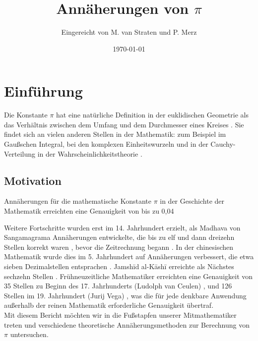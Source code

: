 \documentclass{scrartcl}
\title{Annäherungen von \(\pi\)}
\author{
  Eingereicht von M. van Straten und P. Merz
}
\date{\today}
\begin{document}
\maketitle
\cleardoublepage{}
\tableofcontents
\cleardoublepage{}

\section{Einführung}

Die Konstante \(\pi\) hat eine natürliche Definition in der euklidischen
Geometrie als das Verhältnis zwischen dem Umfang und dem Durchmesser eines
Kreises \cite{wikipedia:Pi, wikipedia:Euclidean_geometry,
    wikipedia:Circumference, wikipedia:Diameter}.
Sie findet sich an vielen anderen Stellen in der Mathematik: zum Beispiel im
Gaußschen Integral, bei den komplexen Einheitswurzeln und in der
Cauchy-Verteilung in der Wahrscheinlichkeitstheorie
\cite{wikipedia:Gaussian_integral, wikipedia:Roots_of_unity,
    wikipedia:Cauchy_distribution, wikipedia:Probability}.

\subsection{Motivation}

Annäherungen für die mathematische Konstante \(\pi\) in der Geschichte der
Mathematik erreichten eine Genauigkeit von bis zu 0,04

Weitere Fortschritte wurden erst im 14.
Jahrhundert erzielt, als Madhava von Sangamagrama Annäherungen entwickelte, die
bis zu elf und dann dreizehn Stellen korrekt waren
\cite{wikipedia:Madhava_of_Sangamagrama}, bevor die Zeitrechnung begann
\cite{wikipedia:Approximation, wikipedia:Pi, wikipedia:History_of_mathematics}.
In der chinesischen Mathematik wurde dies im 5.
Jahrhundert auf Annäherungen verbessert, die etwa sieben Dezimalstellen
entsprachen \cite{wikipedia:Chinese_mathematics}.
Jamshīd al-Kāshī erreichte als Nächstes sechzehn Stellen
\cite{wikipedia:Jamshid_al-Kashi}.
Frühneuzeitliche Mathematiker erreichten eine Genauigkeit von 35 Stellen zu
Beginn des 17.
Jahrhunderts (Ludolph van Ceulen) \cite{wikipedia:Ludolph_van_Ceulen}, und 126
Stellen im 19.
Jahrhundert (Jurij Vega) \cite{wikipedia:Jurij_Vega}, was die für jede denkbare
Anwendung außerhalb der reinen Mathematik erforderliche Genauigkeit übertraf.
\\
Mit diesem Bericht möchten wir in die Fußstapfen unserer Mitmathematiker treten
und verschiedene theoretische Annäherungsmethoden zur Berechnung von \(\pi\)
untersuchen.
\end{document}
